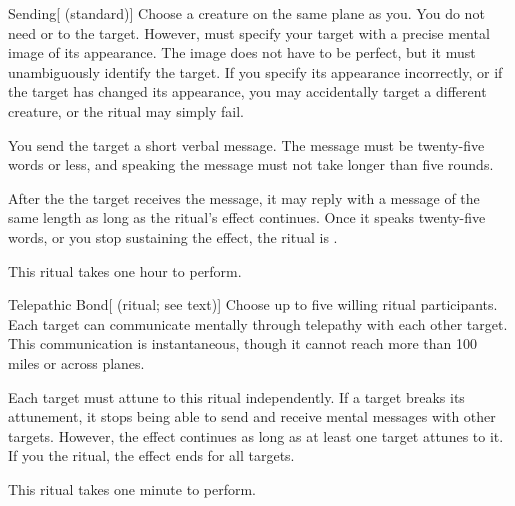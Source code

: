 \begin{ability}[\nth{3}]{Sending}[ (standard)]
Choose a creature on the same plane as you.
You do not need  or  to the target.
However,  must specify your target with a precise mental image of its appearance.
The image does not have to be perfect, but it must unambiguously identify the target.
If you specify its appearance incorrectly, or if the target has changed its appearance, you may accidentally target a different creature, or the ritual may simply fail.

You send the target a short verbal message.
The message must be twenty-five words or less, and speaking the message must not take longer than five rounds.

After the the target receives the message, it may reply with a message of the same length as long as the ritual's effect continues.
Once it speaks twenty-five words, or you stop sustaining the effect, the ritual is .

This ritual takes one hour to perform.
\end{ability}
\vspace{0.25em}



\begin{ability}[\nth{3}]{Telepathic Bond}[ (ritual; see text)]
Choose up to five willing ritual participants.
Each target can communicate mentally through telepathy with each other target.
This communication is instantaneous, though it cannot reach more than 100 miles or across planes.

Each target must attune to this ritual independently.
If a target breaks its attunement, it stops being able to send and receive mental messages with other targets.
However, the effect continues as long as at least one target attunes to it.
If you  the ritual, the effect ends for all targets.

This ritual takes one minute to perform.
\end{ability}
\vspace{0.25em}



